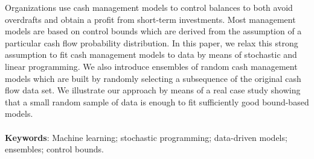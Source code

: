 Organizations use cash management models to control balances to both avoid overdrafts and obtain a profit from short-term investments. Most management models are based on control bounds which are derived from the assumption of a particular cash flow probability distribution. In this paper, we relax this strong assumption to fit cash management models to data by means of stochastic and linear programming. We also introduce ensembles of random cash management models which are built by randomly selecting a subsequence of the original cash flow data set. We illustrate our approach by means of a real case study showing that a small random sample of data is enough to fit sufficiently good bound-based models.
\\
\\

\noindent
\textbf{Keywords}: Machine learning; stochastic programming; data-driven models; ensembles; control bounds.
\\